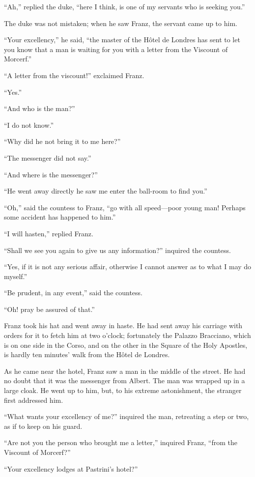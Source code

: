 “Ah,” replied the duke, “here I think, is one of my servants who is
seeking you.”

The duke was not mistaken; when he saw Franz, the servant came up to
him.

“Your excellency,” he said, “the master of the Hôtel de Londres has
sent to let you know that a man is waiting for you with a letter from
the Viscount of Morcerf.”

“A letter from the viscount!” exclaimed Franz.

“Yes.”

“And who is the man?”

“I do not know.”

“Why did he not bring it to me here?”

“The messenger did not say.”

“And where is the messenger?”

“He went away directly he saw me enter the ball-room to find you.”

“Oh,” said the countess to Franz, “go with all speed—poor young man!
Perhaps some accident has happened to him.”

“I will hasten,” replied Franz.

“Shall we see you again to give us any information?” inquired the
countess.

“Yes, if it is not any serious affair, otherwise I cannot answer as to
what I may do myself.”

“Be prudent, in any event,” said the countess.

“Oh! pray be assured of that.”

Franz took his hat and went away in haste. He had sent away his
carriage with orders for it to fetch him at two o’clock; fortunately
the Palazzo Bracciano, which is on one side in the Corso, and on the
other in the Square of the Holy Apostles, is hardly ten minutes’ walk
from the Hôtel de Londres.

As he came near the hotel, Franz saw a man in the middle of the street.
He had no doubt that it was the messenger from Albert. The man was
wrapped up in a large cloak. He went up to him, but, to his extreme
astonishment, the stranger first addressed him.

“What wants your excellency of me?” inquired the man, retreating a step
or two, as if to keep on his guard.

“Are not you the person who brought me a letter,” inquired Franz, “from
the Viscount of Morcerf?”

“Your excellency lodges at Pastrini’s hotel?”

